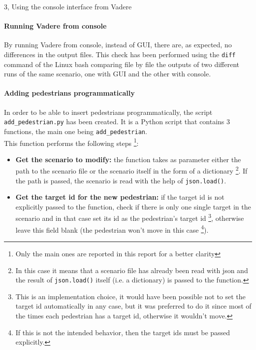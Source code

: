 \documentclass[10pt,a4paper]{article}
\begin{document}
\begin{task}{3, Using the console interface from Vadere}
\paragraph{Running Vadere from console}
By running Vadere from console, instead of GUI, there are, as expected, no differences in the output files.
This check has been performed using the \texttt{diff} command of the Linux bash comparing file by file the outputs of two different runs of the same scenario, one with GUI and the other with console.

\paragraph{Adding pedestrians programmatically}
In order to be able to insert pedestrians programmatically, the script \texttt{add\_pedestrian.py} has been created.
It is a Python script that contains 3 functions, the main one being \texttt{add\_pedestrian}.\\
This function performs the following steps
\footnote{Only the main ones are reported in this report for a better clarity}:
\begin{itemize}
    \item \textbf{Get the scenario to modify:}
    the function takes as parameter either the path to the scenario file or the scenario itself in the form of a dictionary
    \footnote{In this case it means that a scenario file has already been read with json and the result of \texttt{json.load()} itself (i.e. a dictionary) is passed to the function.}.
    If the path is passed, the scenario is read with the help of \texttt{json.load()}.
    
    \item \textbf{Get the target id for the new pedestrian:}
    if the target id is not explicitly passed to the function, check if there is only one single target in the scenario and in that case set its id as the pedestrian's target id
    \footnote{This is an implementation choice, it would have been possible not to set the target id automatically in any case, but it was preferred to do it since most of the times each pedestrian has a target id, otherwise it wouldn't move.},
    otherwise leave this field blank (the pedestrian won't move in this case
    \footnote{If this is not the intended behavior, then the target ids must be passed explicitly.}).
    

\end{itemize}
\end{task}
\end{document}
